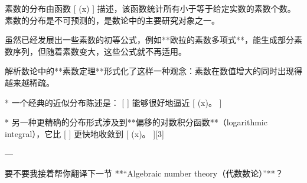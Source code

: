 素数的分布由函数
[
\pi(x)
]
描述，该函数统计所有小于等于给定实数的素数个数。素数的分布是不可预测的，是数论中的主要研究对象之一。

虽然已经发展出一些素数的初等公式，例如**欧拉的素数多项式**，能生成部分素数序列，但随着素数变大，这些公式就不再适用。

解析数论中的**素数定理**形式化了这样一种观念：素数在数值增大的同时出现得越来越稀疏。

* 一个经典的近似分布陈述是：
  [
  ]
  能够很好地逼近
  [
  \pi(x)。
  ]

* 另一种更精确的分布形式涉及到**偏移的对数积分函数**（logarithmic integral），它比
  [
  ]
  更快地收敛到
  [
  \pi(x)。
  ][3]

---

要不要我接着帮你翻译下一节 **“Algebraic number theory（代数数论）”**？
